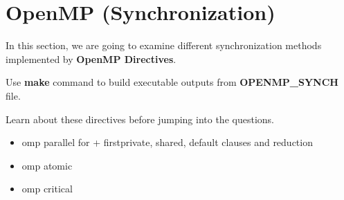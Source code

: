 \section{OpenMP (Synchronization)}
%

In this section, we are going to examine different synchronization methods implemented by \textbf{OpenMP Directives}. 




\vspace{3mm}
\noindent Use \textbf{make} command to build executable outputs from \textbf{OPENMP\_SYNCH} file. 

\noindent Learn about these directives before jumping into the questions.

\begin{itemize}
    \item omp parallel for + firstprivate, shared, default clauses and reduction
    \item omp atomic
    \item omp critical
\end{itemize}

